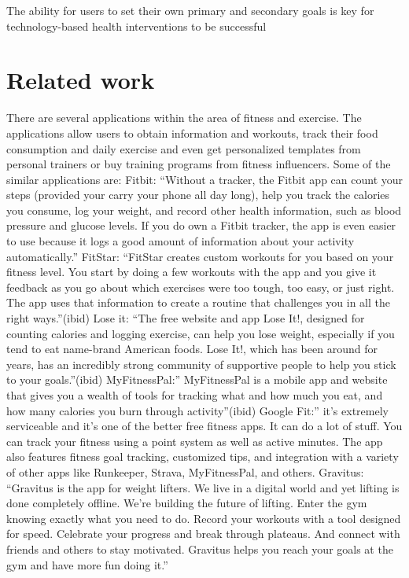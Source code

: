 The ability for users to set their own primary and secondary goals is key for technology-based health interventions to be successful\cite{inproceedings}

\section{Related work}
There are several applications within the area of fitness and exercise. The applications allow users to obtain information and workouts, track their food consumption and daily exercise and even get personalized templates from personal trainers or buy training programs from fitness influencers. Some of the similar applications are:
Fitbit: “Without a tracker, the Fitbit app can count your steps (provided your carry your phone all day long), help you track the calories you consume, log your weight, and record other health information, such as blood pressure and glucose levels. If you do own a Fitbit tracker, the app is even easier to use because it logs a good amount of information about your activity automatically.”\cite{Duffy}
FitStar: “FitStar creates custom workouts for you based on your fitness level. You start by doing a few workouts with the app and you give it feedback as you go about which exercises were too tough, too easy, or just right. The app uses that information to create a routine that challenges you in all the right ways.”(ibid)
Lose it: “The free website and app Lose It!, designed for counting calories and logging exercise, can help you lose weight, especially if you tend to eat name-brand American foods. Lose It!, which has been around for years, has an incredibly strong community of supportive people to help you stick to your goals.”(ibid)
MyFitnessPal:” MyFitnessPal is a mobile app and website that gives you a wealth of tools for tracking what and how much you eat, and how many calories you burn through activity”(ibid)
Google Fit:” it's extremely serviceable and it's one of the better free fitness apps. It can do a lot of stuff. You can track your fitness using a point system as well as active minutes. The app also features fitness goal tracking, customized tips, and integration with a variety of other apps like Runkeeper, Strava, MyFitnessPal, and others. \cite{Hindy}
Gravitus: “Gravitus is the app for weight lifters. We live in a digital world and yet lifting is done completely offline. We're building the future of lifting. Enter the gym knowing exactly what you need to do. Record your workouts with a tool designed for speed. Celebrate your progress and break through plateaus. And connect with friends and others to stay motivated. Gravitus helps you reach your goals at the gym and have more fun doing it.”\cite{Gravitus}

